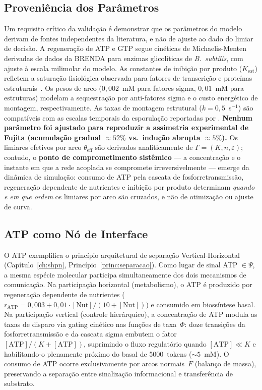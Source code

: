 \subsection{Proveniência dos Parâmetros}

Um requisito crítico da validação é demonstrar que os parâmetros do modelo
derivam de fontes independentes da literatura, e não de ajuste ao dado do
limiar de decisão.
A regeneração de ATP e GTP segue cinéticas de Michaelis-Menten derivadas de
dados da BRENDA para enzimas glicolíticas de \textit{B.~subtilis}, com
ajuste à escala milimolar do modelo.
As constantes de inibição por produto ($K_{\text{sat}}$) refletem a saturação
fisiológica observada para fatores de transcrição e proteínas
estruturais~\cite{BRENDA}.
Os pesos de arco ($0{,}002$~mM para fatores sigma, $0{,}01$~mM para
estruturas) modelam a sequestração por anti-fatores sigma e o custo
energético de montagem, respectivamente.
As taxas de montagem estrutural ($k = 0{,}5$~s$^{-1}$) são compatíveis
com as escalas temporais da esporulação reportadas por \textcite{Fujita2005}.
\textbf{Nenhum parâmetro foi ajustado para reproduzir a assimetria experimental
de Fujita (acumulação gradual $\approx\!52\%$ vs.\ indução abrupta $\approx\!5\%$).}
Os limiares efetivos por arco $\theta_{\text{eff}}$ são derivados
analiticamente de $\Gamma = (K, n, \varepsilon)$; contudo, o
\textbf{ponto de comprometimento sistêmico} --- a concentração e o instante
em que a rede acoplada se compromete irreversivelmente --- emerge da
dinâmica de simulação: consumo de ATP pela cascata de fosforretransmissão,
regeneração dependente de nutrientes e inibição por produto determinam
\emph{quando e em que ordem} os limiares por arco são cruzados, e não de
otimização ou ajuste de curva.

\subsection{ATP como Nó de Interface}

O ATP exemplifica o princípio arquitetural de separação Vertical-Horizontal
(Capítulo~\ref{ch:shpn}, Princípio~\ref{princ:separacao}).
Como lugar de sinal ATP $\in \Psi$, a mesma espécie molecular participa
simultaneamente dos dois mecanismos de comunicação.
Na participação horizontal (metabolismo), o ATP é produzido por regeneração
dependente de nutrientes ($r_{\text{ATP}} = 0{,}003 + 0{,}01 \cdot
[\text{Nut}] / (10 + [\text{Nut}])$) e consumido em biossíntese basal.
Na participação vertical (controle hierárquico), a concentração de ATP
modula as taxas de disparo via gating cinético nas funções de taxa~$\Phi$:
doze transições da fosforretransmissão e da cascata sigma embutem o
fator $[\text{ATP}]/(K + [\text{ATP}])$, suprimindo o fluxo
regulatório quando $[\text{ATP}] \ll K$ e habilitando-o plenamente
próximo do basal de 5000~tokens ($\sim\!5$~mM).
O consumo de ATP ocorre exclusivamente por arcos normais~$F$
(balanço de massa), preservando a separação entre sinalização
informacional e transferência de substrato.

